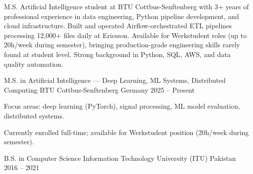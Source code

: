 \documentclass[11pt, a4paper]{awesome-cv}
\begin{document}
\makecvheader[C]


\begin{cvparagraph}
M.S. Artificial Intelligence student at BTU Cottbus-Senftenberg with 3+ years of professional experience in data engineering, Python pipeline development, and cloud infrastructure. Built and operated Airflow-orchestrated ETL pipelines processing 12,000+ files daily at Ericsson. Available for Werkstudent roles (up to 20h/week during semester), bringing production-grade engineering skills rarely found at student level. Strong background in Python, SQL, AWS, and data quality automation.
\end{cvparagraph}


\begin{cventries}
\cventry
{M.S. in Artificial Intelligence — Deep Learning, ML Systems, Distributed Computing}
{BTU Cottbus-Senftenberg}
{Germany}
{2025 -- Present}
{
\begin{cvitems}
\item {Focus areas: deep learning (PyTorch), signal processing, ML model evaluation, distributed systems.}
\item {Currently enrolled full-time; available for Werkstudent position (20h/week during semester).}
\end{cvitems}
}

\cventry
{B.S. in Computer Science}
{Information Technology University (ITU)}
{Pakistan}
{2016 -- 2021}
{}
\end{cventries}

\end{document}
